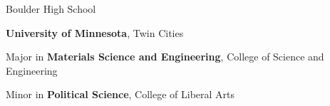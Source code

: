 %
%
%


\begin{scholarship}
					{Boulder High School}
					{\textbf{University of Minnesota}, Twin Cities
					
					Major in \textbf{Materials Science and Engineering}, College of Science and Engineering
					
					Minor in \textbf{Political Science}, College of Liberal Arts}
\end{scholarship}